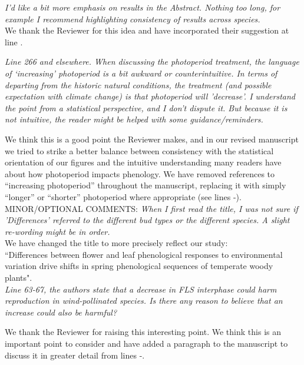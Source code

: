 \documentclass[11pt]{article}
\begin{document}
\emph{I’d like a bit more emphasis on results in the Abstract. Nothing too long, for example I recommend highlighting consistency of results across species.}\\

\noindnet We thank the Reviewer for this idea and have incorporated their suggestion at line .

\emph{Line 266 and elsewhere. When discussing the photoperiod treatment, the language of ‘increasing’ photoperiod is a bit awkward or counterintuitive. In terms of departing from the historic natural conditions, the treatment (and possible expectation with climate change) is that photoperiod will 'decrease'. I understand the point from a statistical perspective, and I don’t dispute it. But because it is not intuitive, the reader might be helped with some guidance/reminders.}

\noindent We think this is a good point the Reviewer makes, and in our revised manuscript we tried to strike a better balance between consistency with the statistical orientation of our figures and the intuitive understanding many readers have about how photoperiod impacts phenology. We have removed references to ``increasing photoperiod'' throughout the manuscript, replacing it with simply ``longer'' or ``shorter'' photoperiod where appropriate (see lines -).\\


MINOR/OPTIONAL COMMENTS:
\emph{When I first read the title, I was not sure if 'Differences' referred to the different bud types or the different species. A slight re-wording might be in order.}\\


\noindent We have changed the title to more precisely reflect our study:\\
``Differences between flower and leaf phenological responses to environmental variation drive shifts in spring phenological sequences of temperate woody plants".\\

\emph{Line 63-67, the authors state that a decrease in FLS interphase could harm reproduction in wind-pollinated species. Is there any reason to believe that an increase could also be harmful?}

\noindent We thank the Reviewer for raising this interesting point. We think this is an important point to consider and have added a paragraph to the manuscript to discuss it in greater detail from lines -. \\
\end{document}
